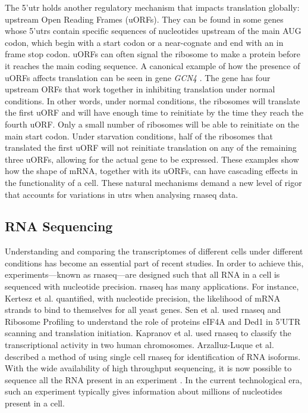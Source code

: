 \documentclass[12pt]{article}
\begin{document}
The 5'\gls{utr} holds another regulatory mechanism that impacts translation globally: upstream Open Reading Frames (uORFs). They can be found in some genes whose 5'\acrshort{utr}s contain specific sequences of nucleotides upstream of the main AUG codon, which begin with a start codon or a near-cognate and end with an in frame stop codon. uORFs can often signal the ribosome to make a protein before it reaches the main coding sequence. A canonical example of how the presence of uORFs affects translation can be seen in gene \textit{GCN4} \cite{Hinnebusch1997}. The gene has four upstream ORFs that work together in inhibiting translation under normal conditions. In other words, under normal conditions, the ribosomes will translate the first uORF and will have enough time to reinitiate by the time they reach the fourth uORF. Only a small number of ribosomes will be able to reinitiate on the main start codon. Under starvation conditions, half of the ribosomes that translated the first uORF will not reinitiate translation on any of the remaining three uORFs, allowing for the actual gene to be expressed. These examples show how the shape of mRNA, together with its uORFs, can have cascading effects in the functionality of a cell. These natural mechanisms demand a new level of rigor that accounts for variations in \acrshort{utr}s when analysing \acrshort{rnaseq} data.

\subsection{RNA Sequencing}
    Understanding and comparing the transcriptomes of different cells under different conditions has become an essential part of recent studies. In order to achieve this, experiments---known as \gls{rnaseq}---are designed such that all RNA in a cell is sequenced with nucleotide precision. \acrshort{rnaseq} has many applications. For instance, Kertesz et al. \cite{Kertesz2010} quantified, with nucleotide precision, the likelihood of mRNA strands to bind to themselves for all yeast genes. Sen et al. \cite{ Sen2015} used \acrshort{rnaseq} and Ribosome Profiling to understand the role of proteins eIF4A and Ded1 in 5'UTR scanning and translation initiation. Kapranov et al. \cite{Kapranov2002} used \acrshort{rnaseq} to classify the transcriptional activity in two human chromosomes. Arzalluz-Luque et al. \cite{ArzalluzLuque2018} described a method of using single cell \acrshort{rnaseq} for identification of RNA isoforms. With the wide availability of high throughput sequencing, it is now possible to sequence all the RNA  present in an experiment \cite{Kukurba2015, Wang2009}. In the current technological era, such an experiment typically gives information about millions of nucleotides present in a cell. 
    
\end{document}
